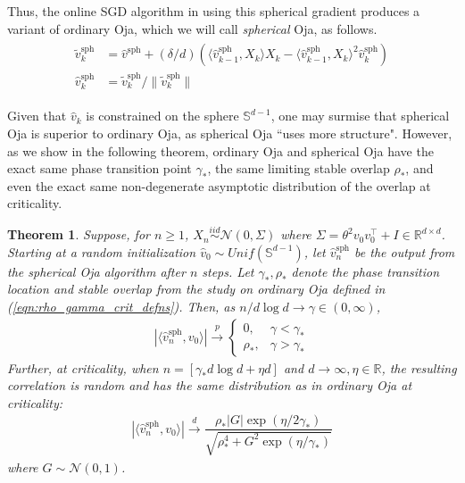 \documentclass[12pt]{article}
\newtheorem{theorem}{Theorem}[section]  %
\newcommand{\sph}{\text{sph}}
\def\gN{{\mathcal{N}}}
\def\sR{{\mathbb{R}}}
\def\sS{{\mathbb{S}}}
\begin{document}
\medskip

Thus, the online SGD algorithm in \citet{arous2021online} using this spherical gradient produces a variant of ordinary Oja, which we will call \textit{spherical} Oja, as follows.
\begin{align}\label{eqn:spherical_oja}
\begin{split}
    \tilde v_k^\sph &= \hat v^\sph + (\delta/d)(\langle \hat v_{k-1}^\sph, X_k\rangle X_k - \langle \hat v_{k-1}^\sph, X_k\rangle^2 \hat v_k^\sph)\\
\hat v_k^\sph &= \tilde v_k^\sph/\|\tilde v_k^\sph\|
\end{split}
\end{align}

\medskip

Given that $\hat v_k$ is constrained on the sphere $\sS^{d-1}$, one may surmise that spherical Oja is superior to ordinary Oja, as spherical Oja ``uses more structure". However, as we show in the following theorem, ordinary Oja and spherical Oja have the exact same phase transition point $\gamma_*$, the same limiting stable overlap $\rho_*$, and even the exact same non-degenerate asymptotic distribution of the overlap at criticality.

\medskip

\begin{theorem}\label{thm:BAGJ}
    Suppose, for $n\geq 1$, $X_n\stackrel{iid}{\sim}\gN(0,\Sigma)$ where $\Sigma=\theta^2v_0v_0^\top+I\in\sR^{d\times d}$. Starting at a random initialization $\hat v_0\sim Unif(\sS^{d-1})$, let $\hat v_n^\sph$ be the output from the spherical Oja algorithm after $n$ steps. Let $\gamma_*,\rho_*$ denote the phase transition location and stable overlap from the study on ordinary Oja defined in (\ref{eqn:rho_gamma_crit_defns}). Then, as $n/d\log d\to\gamma\in(0,\infty)$,
    \begin{align*}
        |\langle \hat v_n^\sph, v_0\rangle|\stackrel{p}{\to}\begin{cases}
            0, & \gamma <\gamma_*\\
            \rho_*, & \gamma > \gamma_*
        \end{cases}
    \end{align*}Further, at criticality, when $n=[\gamma_*d\log d+\eta d]$ and $d\to\infty,\eta\in \sR$, the resulting correlation is random and has the same distribution as in ordinary Oja at criticality:
    \begin{align*}
        |\langle \hat v_n^\sph,v_0\rangle|\stackrel{d}{\to}\dfrac{\rho_* |G|\exp(\eta/2\gamma_*)}{\sqrt{\rho_*^4+G^2\exp(\eta/\gamma_*)}}
    \end{align*}where $G\sim\gN(0,1)$.
\end{theorem}
\end{document}
